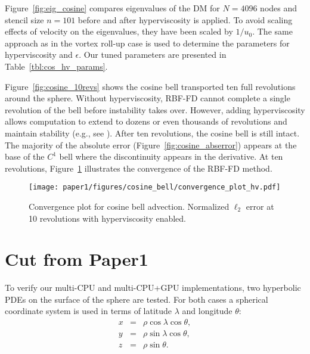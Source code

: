 Figure~\ref{fig:eig_cosine} compares eigenvalues of the DM for $N=4096$ nodes and stencil size $n=101$ before and after hyperviscosity is applied. To avoid scaling effects of velocity on the eigenvalues, they have been scaled by $1/u_0$.  The same approach as in the vortex roll-up case is used to determine the parameters for hyperviscosity and $\epsilon$. Our tuned parameters are presented in 
Table~\ref{tbl:cos_hv_params}.


Figure~\ref{fig:cosine_10revs} shows the cosine bell transported ten full revolutions around the sphere. Without hyperviscosity, RBF-FD cannot complete a single revolution of the bell before instability takes over. However, adding hyperviscosity allows computation to extend to dozens or even thousands of revolutions and maintain stability (e.g., see \cite{FornbergLehto11}). After ten revolutions, the cosine bell is still intact. The majority of the absolute error (Figure~\ref{fig:cosine_abserror}) appears at the base of the $C^1$ bell where the discontinuity appears in the derivative. At ten revolutions, Figure~\ref{fig:conv_cosine_bell} illustrates the convergence of the RBF-FD method. 


\begin{figure}[htbp]
\begin{center}
\texttt{[image: paper1/figures/cosine\_bell/convergence\_plot\_hv.pdf]}
\caption{Convergence plot for cosine bell advection. Normalized $\ell_2$ error at 10 revolutions with hyperviscosity enabled. }
\label{fig:conv_cosine_bell}
\end{center}
\end{figure}


\section{Cut from Paper1}
To verify our multi-CPU and multi-CPU+GPU implementations, two hyperbolic PDEs on the surface of the sphere are tested. For both cases a spherical coordinate system is used in terms of latitude $\lambda$ and longitude $\theta$:
\begin{eqnarray*} 
x & = & \rho \cos \lambda \cos \theta, 	\\
y & = & \rho \sin \lambda \cos \theta, 		\\
z & = & \rho \sin \theta.		
\end{eqnarray*}

